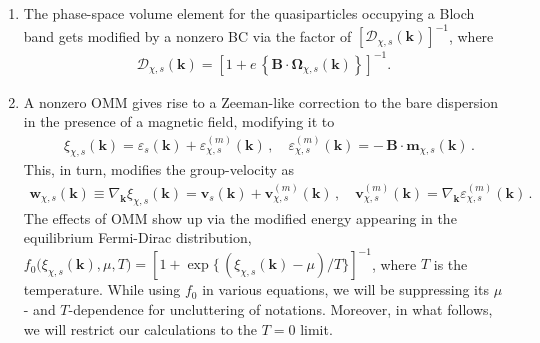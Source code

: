 \documentclass[aps,prb,onecolumn,nofootinbib,citeautoscript,10pt]{revtex4-2}
\begin{document}
\begin{enumerate}

\item The phase-space volume element for the quasiparticles occupying a Bloch band gets modified by a nonzero BC via the factor of $
\left [{\mathcal D}_{ \chi, s }  (\boldsymbol k)\right]^{-1}$, where
\begin{align}
{\mathcal D}_{ \chi, s }  (\boldsymbol k) = \left [1 
+ e \,  \left \lbrace 
{\boldsymbol B} \cdot \boldsymbol{\Omega }_{ \chi, s }  (\boldsymbol k)
\right \rbrace  \right ]^{-1}.
\end{align}


\item A nonzero OMM gives rise to a Zeeman-like correction to the bare dispersion \cite{xiao_review} in the presence of a magnetic field, modifying it to
\begin{align}
\label{eqmodi}
& \xi_{ \chi, s } (\boldsymbol k) 
= \varepsilon_ s  (\boldsymbol k) + \varepsilon_{\chi, s}^{ (m) }  (\boldsymbol k) \, ,
\quad 
\varepsilon_{\chi, s}^{(m)}   (\boldsymbol k) 
= - \,{\boldsymbol B} \cdot \boldsymbol{m }_{\chi, s}  (\boldsymbol k) \,.
\end{align}
This, in turn, modifies the group-velocity as
\begin{align}
{\boldsymbol   w}_{ \chi, s } ({\boldsymbol k} ) \equiv 
 \nabla_{{\boldsymbol k}}   \xi_{ \chi, s } ({\boldsymbol k})
 = {\boldsymbol   v}_s ({\boldsymbol k} ) + {\boldsymbol  v}^{(m)}_{\chi, s} ({\boldsymbol k} ) \,,
\quad {\boldsymbol v}^{(m)}_{\chi, s} ({\boldsymbol k} )
= \nabla_{{\boldsymbol k}} \varepsilon_{\chi, s}^{(m)}   (\boldsymbol k) \,.
\end{align}
The effects of OMM show up via the modified energy appearing in the equilibrium Fermi-Dirac distribution,
$ f_0 \big (\xi_{\chi, s} (\boldsymbol k) , \mu, T \big )
= \left [ 1 + \exp \lbrace \, 
\left(  \xi_{\chi, s} (\boldsymbol k)-\mu \right) /T  \rbrace \right ]^{-1}$,
where $T $ is the temperature.
While using $f_0$ in various equations, we will be suppressing its $\mu$- and $ T $-dependence for uncluttering of notations. Moreover, in what follows, we will restrict our calculations to the $ T = 0$ limit.



\end{enumerate}
\end{document}

